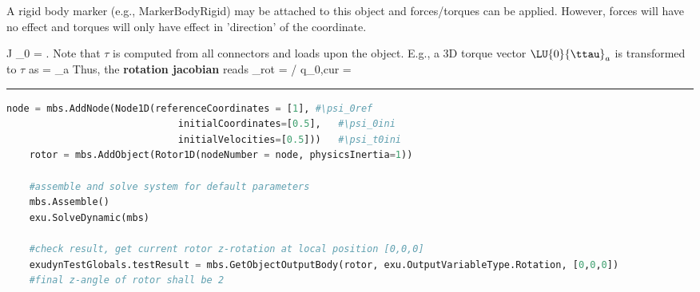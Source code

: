     \finishTable
    A rigid body marker (e.g., MarkerBodyRigid) may be attached to this object and forces/torques can be applied. 
    However, forces will have no effect and torques will only have effect in 'direction' of the coordinate.

    \be 
      J \cdot \ddot \psi_0 = \tau.
    \ee
    Note that $\tau$ is computed from all connectors and loads upon the object. E.g., a 3D torque vector $\LU{0}{\ttau}_a$ is 
    transformed to $\tau$ as
    \be
      \tau =  _a
    \ee
    Thus, the {\bf rotation jacobian} reads 
    \be
      \Jm_{rot} = \partial \tomega\cCur / \partial \dot q_{0,cur} = 
        
    \ee
\vspace{6pt}\par\noindent\rule{\textwidth}{0.4pt}
\label{miniExample_ObjectRotationalMass1D}
\pythonstyle
\begin{lstlisting}[language=Python, firstnumber=1]
    node = mbs.AddNode(Node1D(referenceCoordinates = [1], #\psi_0ref
                              initialCoordinates=[0.5],   #\psi_0ini
                              initialVelocities=[0.5]))   #\psi_t0ini
    rotor = mbs.AddObject(Rotor1D(nodeNumber = node, physicsInertia=1))

    #assemble and solve system for default parameters
    mbs.Assemble()
    exu.SolveDynamic(mbs)

    #check result, get current rotor z-rotation at local position [0,0,0]
    exudynTestGlobals.testResult = mbs.GetObjectOutputBody(rotor, exu.OutputVariableType.Rotation, [0,0,0])
    #final z-angle of rotor shall be 2
\end{lstlisting}

